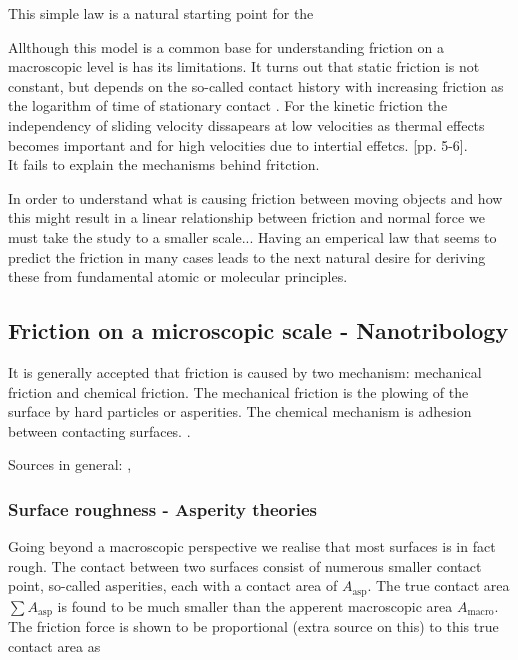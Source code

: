 This simple law is a natural starting point for the

Allthough this model is a common base for understanding friction on a macroscopic level is has its limitations. It turns out that static friction is not constant, but depends on the so-called contact history with increasing friction as the logarithm of time of stationary contact \cite{dieterich_1972}. For the kinetic friction the independency of sliding velocity dissapears at low velocities as thermal effects becomes important and for high velocities due to intertial effetcs. \cite{gnecco_meyer_2015}[pp. 5-6]. \\

It fails to explain the mechanisms behind fritction.
 

In order to understand what is causing friction between moving objects and how this might result in a linear relationship between friction and normal force we must take the study to a smaller scale...
Having an emperical law that seems to predict the friction in many cases leads to the next natural desire for deriving these from fundamental atomic or molecular principles.

\subsection{Friction on a microscopic scale - Nanotribology}
It is generally accepted that friction is caused by two mechanism: mechanical friction and chemical friction. The mechanical friction is the plowing of the surface by hard particles or asperities. The chemical mechanism is adhesion between contacting surfaces. \cite{kim_nano-scale_2009}.


Sources in general: \cite{mo_friction_2009}, \cite{kim_nano-scale_2009} \\

\subsubsection{Surface roughness - Asperity theories}

Going beyond a macroscopic perspective we realise that most surfaces is in fact rough. The contact between two surfaces consist of numerous smaller contact point, so-called asperities, each with a contact area of $A_{\text{asp}}$. The true contact area $\sum A_{\text{asp}}$ is found to be much smaller than the apperent macroscopic area $A_{\text{macro}}$. The friction force is shown to be proportional (extra source on this) to this true contact area as 

